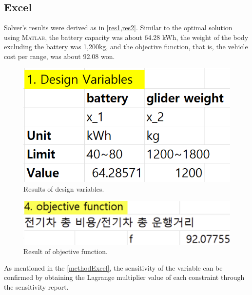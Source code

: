 \documentclass[11pt,twocolumn]{article}
\begin{document}
        \subsection{Excel}
            Solver's results were derived as in \cref{res1,res2}.
            Similar to the optimal solution using \textsc{Matlab}, the battery capacity was about 64.28 kWh, the weight of the body excluding the battery was 1,200kg, and the objective function, that is, the vehicle cost per range, was about 92.08 won.
            \begin{figure}[h]
                    \centering
                    \includegraphics[width=.8\columnwidth]{Excel55.png}
                    \caption{Results of design variables.}
                    \label{res1}
            \end{figure}
            \begin{figure}[h]
                    \centering
                    \includegraphics[width=.8\columnwidth]{Excel6.png}
                    \caption{Result of objective function.}
                    \label{res2}
            \end{figure}
            \par
            As mentioned in the \cref{methodExcel}, the sensitivity of the variable can be confirmed by obtaining the Lagrange multiplier value of each constraint through the sensitivity report.
\end{document}
